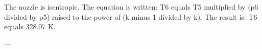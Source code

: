 The nozzle is isentropic.  
The equation is written:  
T6 equals T5 multiplied by (p6 divided by p5) raised to the power of (k minus 1 divided by k).  
The result is: T6 equals 328.07 K.  

---